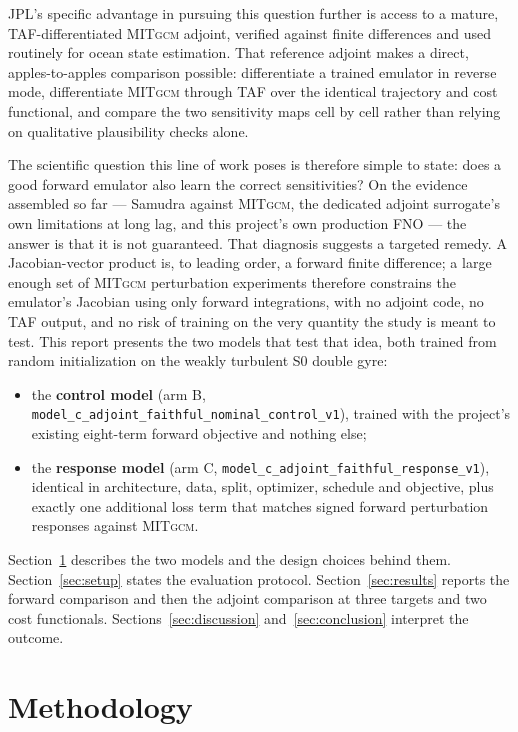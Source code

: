 \documentclass[3p,12pt]{elsarticle}
\newcommand{\MITgcm}{\textsc{MITgcm}}
\newcommand{\FNO}{FNO}
\begin{document}
JPL's specific advantage in pursuing this question further is access to a
mature, TAF-differentiated \MITgcm{} adjoint, verified against finite
differences and used routinely for ocean state estimation. That reference
adjoint makes a direct, apples-to-apples comparison possible: differentiate a
trained emulator in reverse mode, differentiate \MITgcm{} through TAF over the
identical trajectory and cost functional, and compare the two sensitivity maps
cell by cell rather than relying on qualitative plausibility checks alone.

The scientific question this line of work poses is therefore simple to state:
does a good forward emulator also learn the correct sensitivities? On the
evidence assembled so far --- Samudra against \MITgcm{}, the dedicated adjoint
surrogate's own limitations at long lag, and this project's own production
\FNO{} --- the answer is that it is not guaranteed. That diagnosis suggests a targeted remedy. A Jacobian-vector product is, to
leading order, a forward finite difference; a large enough set of \MITgcm{}
perturbation experiments therefore constrains the emulator's Jacobian using only
forward integrations, with no adjoint code, no TAF output, and no risk of
training on the very quantity the study is meant to test. This report presents
the two models that test that idea, both trained from random initialization on
the weakly turbulent S0 double gyre:

\begin{itemize}
\item the \textbf{control model} (arm B, \texttt{model\_c\_adjoint\_faithful\_nominal\_control\_v1}),
trained with the project's existing eight-term forward objective and nothing else;
\item the \textbf{response model} (arm C, \texttt{model\_c\_adjoint\_faithful\_response\_v1}),
identical in architecture, data, split, optimizer, schedule and objective, plus
exactly one additional loss term that matches signed forward perturbation
responses against \MITgcm{}.
\end{itemize}

Section~\ref{sec:method} describes the two models and the design choices behind
them. Section~\ref{sec:setup} states the evaluation protocol. Section~\ref{sec:results}
reports the forward comparison and then the adjoint comparison at three targets and
two cost functionals. Sections~\ref{sec:discussion} and~\ref{sec:conclusion}
interpret the outcome.

\section{Methodology}
\label{sec:method}
\end{document}
